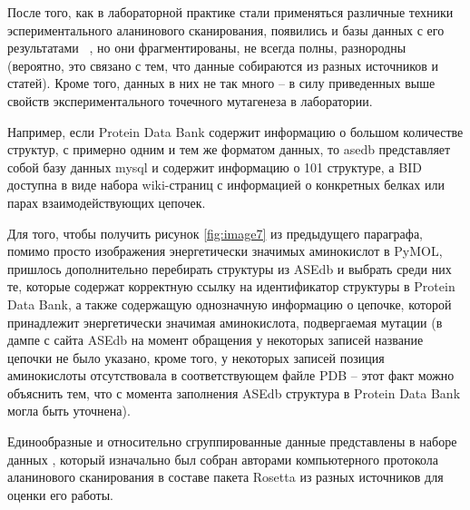 



После того, как в лабораторной практике стали применяться различные техники эспериментального аланинового сканирования, появились и базы данных с его результатами ~\cite{asedb2001, bid2003}, но они фрагментированы, не всегда полны, разнородны (вероятно, это связано с тем, что данные собираются из разных источников и статей). Кроме того, данных в них не так много -- в силу приведенных выше свойств экспериментального точечного мутагенеза в лаборатории.

Например, если Protein Data Bank содержит информацию о большом количестве структур, с примерно одним и тем же форматом данных, то asedb представляет собой базу данных mysql и содержит информацию о 101 структуре, а BID доступна в виде набора wiki-страниц с информацией о конкретных белках или парах взаимодействующих цепочек.

Для того, чтобы получить рисунок \ref{fig:image7} из предыдущего параграфа, помимо просто изображения энергетически значимых аминокислот в PyMOL, пришлось дополнительно перебирать структуры из ASEdb и выбрать среди них те, которые содержат корректную ссылку на идентификатор структуры в Protein Data Bank, а также содержащую однозначную информацию о цепочке, которой принадлежит энергетически значимая аминокислота, подвергаемая мутации (в дампе с сайта ASEdb на момент обращения у некоторых записей название цепочки не было указано, кроме того, у некоторых записей позиция аминокислоты отсутствовала в соответствующем файле PDB -- этот факт можно объяснить тем, что с момента заполнения ASEdb структура в Protein Data Bank могла быть уточнена).

Единообразные и относительно сгруппированные данные представлены в наборе данных  \cite{kortemme_alascan_datasets}, который изначально был собран авторами компьютерного протокола аланинового сканирования в составе пакета Rosetta \cite{kortemme2002, kortemme2004} из разных источников для оценки его работы.

\cite{hotspots}
\cite{very_good, interface_dist_cutoff, water, orings, numpy, qhull, cython}
\cite{ numpy, qhull, cython, antibody, bloomberg, sdr_db}